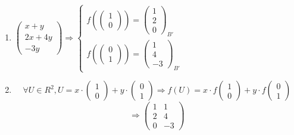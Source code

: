 \documentclass[notitlepage]{math}
\begin{document}
\begin{enumerate}[label=\protect\circled{\arabic*}]
    \item $\begin{pmatrix}
        x + y \\
        2x + 4y \\
        -3y
    \end{pmatrix} \Rightarrow \begin{cases}
        f(\begin{pmatrix} 1 \\ 0 \end{pmatrix}) = {\begin{pmatrix} 1 \\ 2 \\ 0 \end{pmatrix}}_{B'} \\
        f(\begin{pmatrix} 0 \\ 1 \end{pmatrix}) = {\begin{pmatrix} 1 \\ 4 \\ -3 \end{pmatrix}}_{B'}
    \end{cases}$
    \item \[\forall U \in R^2, U = x \cdot \begin{pmatrix} 1 \\ 0 \end{pmatrix} + y \cdot \begin{pmatrix} 0 \\ 1 \end{pmatrix} \Rightarrow f(U) = x \cdot f \begin{pmatrix} 1 \\ 0 \end{pmatrix} + y \cdot f \begin{pmatrix} 0 \\ 1 \end{pmatrix}\]
    \[ \Rightarrow \begin{pmatrix}
        1 & 1 \\
        2 & 4 \\
        0 & -3
    \end{pmatrix}\]
\end{enumerate}
\end{document}
